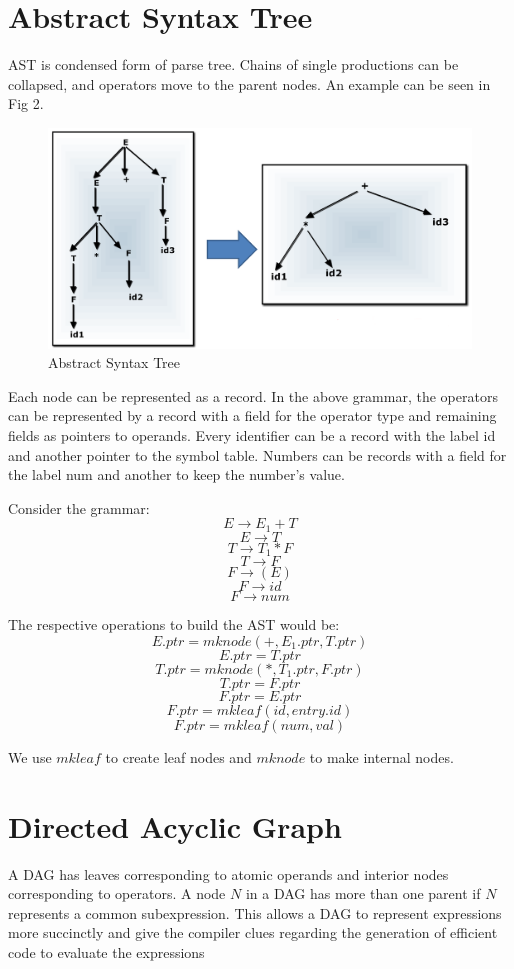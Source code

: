 \documentclass[12pt,letterpaper]{book}
\theoremstyle{definition}
\begin{document}
\section{Abstract Syntax Tree}

AST is condensed form of parse tree. Chains of single productions can be collapsed, and operators move to the parent nodes. An example can be seen in Fig 2.

\begin{figure}[htpb]
  \centering
  \includegraphics[width=0.8\linewidth]{assets/ast_eg.png}
  \caption{Abstract Syntax Tree}%
  \label{fig:}
\end{figure}

Each node can be represented as a record. In the above grammar, the operators can be represented by a record with a field for the operator type and remaining fields as pointers to operands. Every identifier can be a record with the label id and another pointer to the symbol table. Numbers can be records with a field for the label num and another to keep the number's value.

Consider the grammar:
\[E \rightarrow E_1 + T\]
\[E \rightarrow T\]
\[T \rightarrow T_1 * F\]
\[T \rightarrow F\]
\[F \rightarrow (E)\]
\[F \rightarrow id\]
\[F \rightarrow num\]

The respective operations to build the AST would be:
\[E.ptr = mknode(+,E_1.ptr,T.ptr)\]
\[E.ptr = T.ptr\]
\[T.ptr = mknode(*,T_1.ptr,F.ptr)\]
\[T.ptr = F.ptr\]
\[F.ptr = E.ptr\]
\[F.ptr = mkleaf(id,entry.id)\]
\[F.ptr = mkleaf(num,val)\]

We use $mkleaf$ to create leaf nodes and $mknode$ to make internal nodes.

\section{Directed Acyclic Graph}

A DAG has leaves corresponding to atomic operands and interior nodes corresponding to operators. A node $N$ in a DAG has more than one parent if $N$ represents a common subexpression. This allows a DAG to represent expressions more succinctly and give the compiler clues regarding the generation of efficient code to evaluate the expressions
\end{document}
